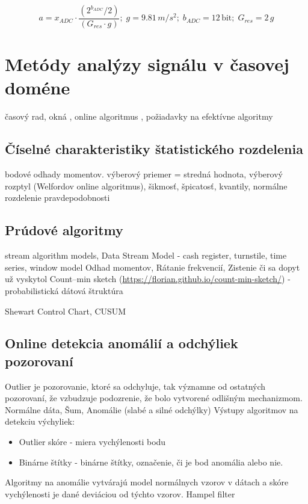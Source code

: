 \begin{equation}
a = x_{ADC} \cdot \frac{(2^{b_{ADC}} / 2)}{(G_{res} \cdot g)};\; g = 9.81\,m/s^2;\; b_{ADC} = 12\,\mathrm{bit};\; G_{res} = 2\,g
\end{equation}

\section{Metódy analýzy signálu v časovej doméne}
časový rad, okná
\cite{time-series-analysis} \cite{practical-time-series} \cite{generalized-esd} \cite{twitter-esd}, 
online algoritmus \cite{online-anomaly-detection}, 
požiadavky na efektívne algoritmy
	

\subsection{Číselné charakteristiky štatistického rozdelenia}
bodové odhady momentov. výberový priemer = stredná hodnota, výberový rozptyl (Welfordov online algoritmus), šikmosť, špicatosť, kvantily, normálne rozdelenie pravdepodobnosti

\subsection{Prúdové algoritmy}
stream algorithm models, Data Stream Model - cash register, turnstile, time series, window model
Odhad momentov, Rátanie frekvencií, Zistenie či sa dopyt už vyskytol
Count–min sketch (\url{https://florian.github.io/count-min-sketch/}) - probabilistická dátová štruktúra

Shewart Control Chart, CUSUM


\subsection{Online detekcia anomálií a odchýliek pozorovaní}
Outlier je pozorovanie, ktoré sa odchyluje, tak významne od ostatných pozorovaní, že vzbudzuje
podozrenie, že bolo vytvorené odlišným mechanizmom. Normálne dáta, Šum, Anomálie (slabé a silné odchýlky)
Výstupy algoritmov na detekciu výchyliek: 
\begin{itemize}
\itemsep0pt
\item Outlier skóre - miera vychýlenosti bodu
\item Binárne štítky - binárne štítky, označenie, či je bod anomália alebo nie.
\end{itemize}
Algoritmy na anomálie vytvárajú model normálnych vzorov v dátach a skóre vychýlenosti je dané deviáciou od týchto vzorov.
\cite{outlier-analysis} 
Hampel filter

